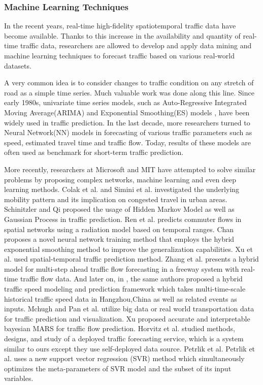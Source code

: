 \subsubsection*{Machine Learning Techniques}
In the recent years, real-time high-fidelity spatiotemporal 
traffic data have become available. Thanks to this increase 
in the availability and quantity of real-time traffic data, 
researchers are allowed to develop and apply data mining and 
machine learning techniques to forecast traffic based on various 
real-world datasets.
	 	
A very common idea is to consider changes to traffic condition
on any stretch of road as a simple time series. 
Much valuable work was done along this line. Since early 1980s, 
univariate time series models, such as Auto-Regressive Integrated 
Moving Average(ARIMA)\cite{ARIMA} and Exponential Smoothing(ES) 
models \cite{ES,ES2}, have been widely used in traffic prediction. 
In the last decade, more researchers turned to Neural Network(NN) 
models in forecasting of various traffic parameters such as 
speed\cite{Xiao2003Fuzzy,Ishak2004Optimizing}, 
estimated travel time\cite{Lint2005Accurate} and 
traffic flow\cite{Stephanedes1981IMPROVED,Messer1998Short}. 
Today, results of these models are often used as benchmark 
for short-term traffic prediction. 

More recently, researchers at Microsoft and MIT\cite{} 
have attempted to solve similar problems by proposing 
complex networks, machine learning and even deep learning methods. 
Colak et al.\cite{Colak2016} and Simini et al.\cite{Simini2012} 
investigated the underlying mobility pattern and 
its implication on congested travel in urban areas. 
Schinitzler and Qi \cite{Schnitzler2014,Qi2014} proposed the 
usage of Hidden Markov Model as well as Gaussian Process 
in traffic prediction. Ren et al. \cite{Ren2014} predicts 
commuter flows in spatial networks using a radiation model based 
on temporal ranges. Chan \cite{Chan2012Neural} proposes a 
novel neural network training method that employs the 
hybrid exponential smoothing method to improve the generalization 
capabilities. Xu et al. \cite{Xu2015,Xu2015a} used 
spatial-temporal traffic prediction method. 
Zhang et al.\cite{zhang2014hybrid} presents a hybrid model for 
multi-step ahead traffic flow forecasting in a freeway system 
with real-time traffic flow data. And later on, 
in \cite{Zhang2015Hybrid}, the same authors proposed a 
hybrid traffic speed modeling and prediction framework which 
takes multi-time-scale historical traffic speed data in 
Hangzhou,China as well as related events as inputs. 
Mchugh and Pan et al.\cite{Mchugh2015,Pan2012} utilize 
big data or real world transportation data for traffic prediction 
and visualization. Xu \cite{Xu2014} proposed accurate and 
interpretable bayesian MARS for traffic flow prediction. 
Horvitz et al. \cite{Horvitz2012} studied methods, designs, and 
study of a deployed traffic forecasting service, which is 
a system similar to ours except they use self-deployed data source. 
Petrlik et al. Petrlik et al. \cite{Petrlik2015Towards} 
uses a new support vector regression (SVR) method 
which simultaneously optimizes the meta-parameters of SVR 
model and the subset of its input variables.
		
